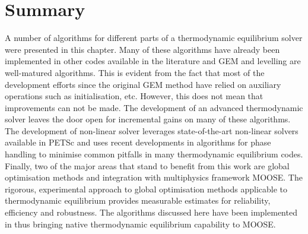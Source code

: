 \section{Summary}
	A number of algorithms for different parts of a thermodynamic equilibrium solver were presented in this chapter. Many of these algorithms have already been implemented in other codes available in the literature and GEM and levelling are well-matured algorithms. This is evident from the fact that most of the development efforts since the original GEM method have relied on auxiliary operations such as initialisation, etc. However, this does not mean that improvements can not be made.  The development of an advanced thermodynamic solver leaves the door open for incremental gains on many of these algorithms. The development of non-linear solver leverages state-of-the-art non-linear solvers available in PETSc and uses recent developments in algorithms for phase handling to minimise common pitfalls in many thermodynamic equilibrium codes. Finally, two of the major areas that stand to benefit from this work are global optimisation methods and integration with multiphysics framework {MOOSE}. The rigorous, experimental approach to global optimisation methods applicable to thermodynamic equilibrium provides measurable estimates for reliability, efficiency and robustness. The algorithms discussed here have been implemented in {\GEM} thus bringing native thermodynamic equilibrium capability to MOOSE.
